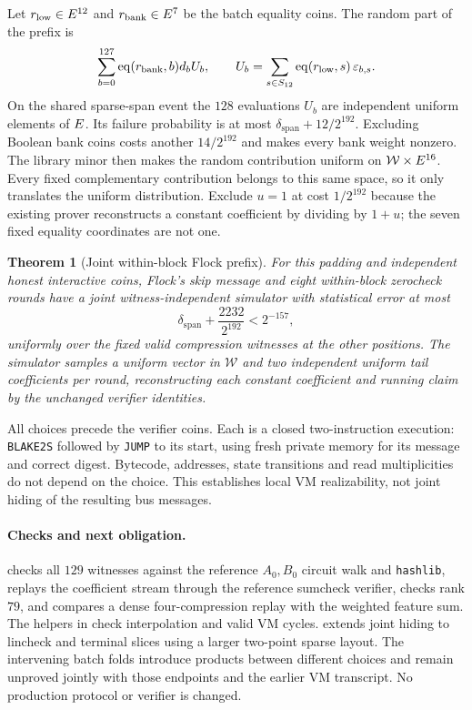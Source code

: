 \documentclass[11pt]{article}
\newtheorem{theorem}{Theorem}
\begin{document}
Let $r_{\rm low}\in E^{12}$ and $r_{\rm bank}\in E^7$ be the batch equality coins. The random part of the prefix is
\[
 \sum_{b=0}^{127}\operatorname{eq}(r_{\rm bank},b)d_bU_b,
 \qquad
 U_b=\sum_{s\in S_{12}}\operatorname{eq}(r_{\rm low},s)\,\varepsilon_{b,s}.
\]
On the shared sparse-span event the $128$ evaluations $U_b$ are independent uniform elements of $E$. Its failure probability is at most $\delta_{\mathrm{span}}+12/2^{192}$. Excluding Boolean bank coins costs another $14/2^{192}$ and makes every bank weight nonzero. The library minor then makes the random contribution uniform on $\mathcal W\times E^{16}$. Every fixed complementary contribution belongs to this same space, so it only translates the uniform distribution. Exclude $u=1$ at cost $1/2^{192}$ because the existing prover reconstructs a constant coefficient by dividing by $1+u$; the seven fixed equality coordinates are not one.

\begin{theorem}[Joint within-block Flock prefix]
For this padding and independent honest interactive coins, Flock's skip message and eight within-block zerocheck rounds have a joint witness-independent simulator with statistical error at most
\[
 \delta_{\mathrm{span}}+\frac{2232}{2^{192}}<2^{-157},
\]
uniformly over the fixed valid compression witnesses at the other positions. The simulator samples a uniform vector in $\mathcal W$ and two independent uniform tail coefficients per round, reconstructing each constant coefficient and running claim by the unchanged verifier identities.
\end{theorem}

All choices precede the verifier coins. Each is a closed two-instruction execution: \texttt{BLAKE2S} followed by \texttt{JUMP} to its start, using fresh private memory for its message and correct digest. Bytecode, addresses, state transitions and read multiplicities do not depend on the choice. This establishes local VM realizability, not joint hiding of the resulting bus messages.

\paragraph{Checks and next obligation.}  checks all $129$ witnesses against the reference $A_0,B_0$ circuit walk and \texttt{hashlib}, replays the coefficient stream through the reference sumcheck verifier, checks rank $79$, and compares a dense four-compression replay with the weighted feature sum. The helpers in  check interpolation and valid VM cycles.  extends joint hiding to lincheck and terminal slices using a larger two-point sparse layout. The intervening batch folds introduce products between different choices and remain unproved jointly with those endpoints and the earlier VM transcript. No production protocol or verifier is changed.
\end{document}

